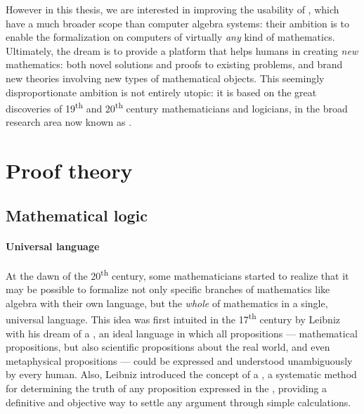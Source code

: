 However in this thesis, we are interested in improving the usability of
, which have a much broader scope than computer algebra
systems: their ambition is to enable the formalization on computers of virtually
\emph{any} kind of mathematics. Ultimately, the dream is to provide a platform
that helps humans in creating \emph{new} mathematics: both novel solutions and
proofs to existing problems, and brand new theories involving new types of
mathematical objects. This seemingly disproportionate ambition is not entirely
utopic: \AP it is based on the great discoveries of 19\textsuperscript{th} and
20\textsuperscript{th} century mathematicians and logicians, in the broad
research area now known as .

\section{Proof theory}

\subsection{Mathematical logic}

\paragraph{Universal language}

\AP
At the dawn of the 20\textsuperscript{th} century, some mathematicians started
to realize that it may be possible to formalize not only specific branches of
mathematics like algebra with their own language, but the \emph{whole} of
mathematics in a single, universal language. This idea was first intuited in the
17\textsuperscript{th} century by Leibniz with his dream of a
, an ideal language in which all propositions
--- mathematical propositions, but also scientific propositions about the real
world, and even metaphysical propositions --- could be expressed and understood
unambiguously by every human. Also, Leibniz introduced the concept of a
, a systematic method for determining the truth of
any proposition expressed in the , providing a
definitive and objective way to settle any argument through simple
calculations.

